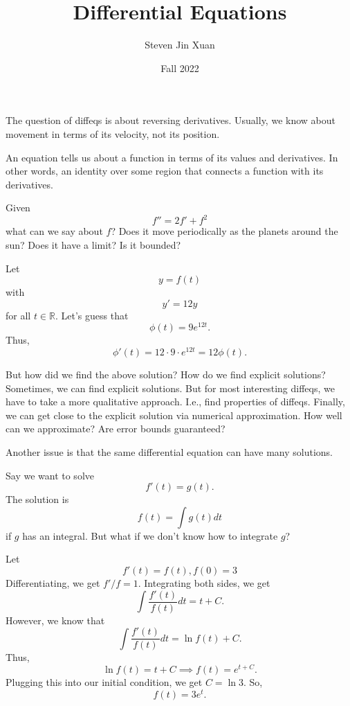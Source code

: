 \documentclass{article}[11, letterpaper]
\author{Steven Jin Xuan}
\date{Fall 2022}
\title{Differential Equations}
\begin{document}
\maketitle

\pagebreak
{}

The question of diffeqs is about reversing derivatives.
Usually, we know about movement in terms of its velocity, not its position.

\begin{definition}
  An equation tells us about a function in terms of its values and derivatives.
  In other words, an identity over some region that connects a function with its derivatives.
\end{definition}

\begin{eg}
  Given
  \[
    f'' = 2f' + f^2
  \]
  what can we say about $f$?
  Does it move periodically as the planets around the sun?
  Does it have a limit? Is it bounded?
\end{eg}

\begin{eg}
  Let
  \[
    y = f(t)
  \]
  with
  \[
    y' = 12y
  \]
  for all $t \in \mathbb{R}$.
  Let's guess that
  \[
    \phi(t) = 9 e^{12t}.
  \]
  Thus,
  \[
    \phi'(t) = 12 \cdot 9 \cdot e^{12t} = 12 \phi(t).
  \]
\end{eg}

But how did we find the above solution?
How do we find explicit solutions?
Sometimes, we can find explicit solutions.
But for most interesting diffeqs, we have to take a more qualitative approach.
I.e., find properties of diffeqs.
Finally, we can get close to the explicit solution via numerical approximation.
How well can we approximate? Are error bounds guaranteed?

Another issue is that the same differential equation can have many solutions.

\begin{theorem}
  Say we want to solve
  \[
    f'(t) = g(t).
  \]
  The solution is
  \[
    f(t) = \int g(t) dt
  \]
  if $g$ has an integral.
  But what if we don't know how to integrate $g$?
\end{theorem}

\begin{eg}
  Let
  \[
    f'(t) = f(t), f(0) = 3
  \]
  Differentiating, we get $f'/f = 1$.
  Integrating both sides, we get
  \[
    \int \frac{ f'(t) }{ f(t) } dt = t + C.
  \]
  However, we know that
  \[
    \int \frac{ f'(t) }{ f(t) } dt = \ln f(t) + C.
  \]
  Thus,
  \[
    \ln f(t) = t + C \implies f(t) = e^{t + C}.
  \]
  Plugging this into our initial condition, we get $C = \ln3$.
  So,
  \[
    f(t) = 3e^{t}.
  \]
\end{eg}
\end{document}
